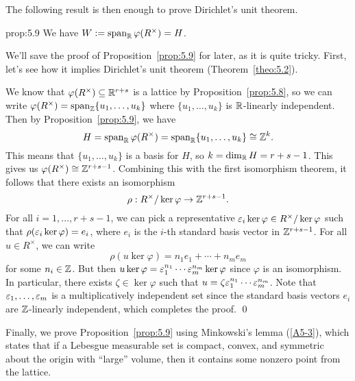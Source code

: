 The following result is then enough to prove Dirichlet's unit theorem. 

\begin{prop}{prop:5.9}
    We have $W := \operatorname{span}_{\mathbb{R}} \varphi(R^\times) = H$. 
\end{prop}\vspace{-0.25cm}

We'll save the proof of Proposition~\ref{prop:5.9} for later, as it is quite tricky. 
First, let's see how it implies Dirichlet's unit theorem (Theorem~\ref{theo:5.2}). 

\begin{pf}[Dirichlet]
    We know that $\varphi(R^\times) \subseteq \mathbb{R}^{r+s}$ is a lattice by 
    Proposition~\ref{prop:5.8}, so we can write $\varphi(R^\times) = 
    \operatorname{span}_{\mathbb{Z}}\{u_1, \dots, u_k\}$ where $\{u_1, \dots, u_k\}$ is $\mathbb{R}$-linearly independent. 
    Then by Proposition~\ref{prop:5.9}, we have 
    \[ H = \operatorname{span}_{\mathbb{R}} \varphi(R^\times) = \operatorname{span}_{\mathbb{R}}\{u_1, \dots, u_k\} \cong \mathbb{Z}^k. \] 
    This means that $\{u_1, \dots, u_k\}$ is a basis for $H$, so $k = \dim_{\mathbb{R}} H = r + s - 1$.
    This gives us $\varphi(R^\times) \cong \mathbb{Z}^{r+s-1}$. Combining this with the first 
    isomorphism theorem, it follows that there exists an isomorphism  
    \[ \rho : R^\times/\ker\varphi \to \mathbb{Z}^{r+s-1}. \] 
    For all $i = 1, \dots, r+s-1$, we can pick a representative $\varepsilon_i \ker\varphi \in 
    R^\times/\ker\varphi$ such that $\rho(\varepsilon_i \ker\varphi) = e_i$, where $e_i$ 
    is the $i$-th standard basis vector in $\mathbb{Z}^{r+s-1}$. For all $u \in R^\times$, we 
    can write 
    \[ \rho(u\ker\varphi) = n_1 e_1 + \cdots + n_m e_m \] 
    for some $n_i \in \mathbb{Z}$. But then $u\ker\varphi = \varepsilon_1^{n_1} \cdots \varepsilon_m^{n_m} 
    \ker\varphi$ since $\varphi$ is an isomorphism. In particular, there 
    exists $\zeta \in \ker\varphi$ such that $u = \zeta \varepsilon_1^{n_1} \cdots \varepsilon_m^{n_m}$. 
    Note that $\varepsilon_1, \dots, \varepsilon_m$ is a multiplicatively independent set since 
    the standard basis vectors $e_i$ are $\mathbb{Z}$-linearly independent, which completes the proof. \qed 
\end{pf}\vspace{-0.25cm}

Finally, we prove Proposition~\ref{prop:5.9} using Minkowski's lemma (\ref{A5-3}),
which states that if a Lebesgue 
measurable set is compact, convex, and symmetric about the origin with ``large'' 
volume, then it contains some nonzero point from the lattice.

